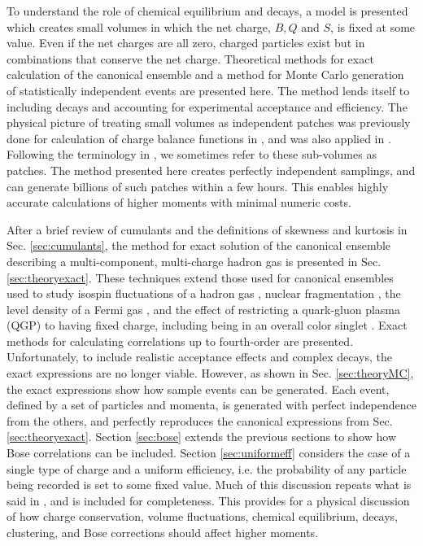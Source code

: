 To understand the role of chemical equilibrium and decays, a model is presented which creates small volumes in which the net charge, $B,Q$ and $S$, is fixed at some value. Even if the net charges are all zero, charged particles exist but in combinations that conserve the net charge. Theoretical methods for exact calculation of the canonical ensemble and a method for Monte Carlo generation of statistically independent events are presented here. The method lends itself to including decays and accounting for experimental acceptance and efficiency. The physical picture of treating small volumes as independent patches was previously done for calculation of charge balance functions in \cite{Schlichting:2010qia,Schlichting:2010na,Pratt:2010zn}, and was also applied in \cite{Oliinychenko:2020cmr}. Following the terminology in \cite{Oliinychenko:2020cmr}, we sometimes refer to these sub-volumes as patches. The method presented here creates perfectly independent samplings, and can generate billions of such patches within a few hours. This enables highly accurate calculations of higher moments with minimal numeric costs.

After a brief review of cumulants and the definitions of skewness and kurtosis in Sec. \ref{sec:cumulants}, the method for exact solution of the canonical ensemble describing a multi-component, multi-charge hadron gas is presented in Sec. \ref{sec:theoryexact}. These techniques extend those used for canonical ensembles used to study isospin fluctuations of a hadron gas \cite{Cheng:2002jb}, nuclear fragmentation \cite{Pratt:1999ht}, the level density of a Fermi gas \cite{Pratt:1999ns}, and the effect of restricting a quark-gluon plasma (QGP) to having fixed charge, including being in an overall color singlet \cite{Pratt:2003jd}. Exact methods for calculating correlations up to fourth-order are presented. Unfortunately, to include realistic acceptance effects and complex decays, the exact expressions are no longer viable. However, as shown in Sec. \ref{sec:theoryMC}, the exact expressions show how sample events can be generated. Each event, defined by a set of particles and momenta, is generated with perfect independence from the others, and perfectly reproduces the canonical expressions from Sec. \ref{sec:theoryexact}. Section \ref{sec:bose} extends the previous sections to show how Bose correlations can be included. Section \ref{sec:uniformeff} considers the case of a single type of charge and a uniform efficiency, i.e. the probability of any particle being recorded is set to some fixed value. Much of this discussion repeats what is said in \cite{Savchuk:2019xfg}, and is included for completeness. This provides for a physical discussion of how charge conservation, volume fluctuations, chemical equilibrium, decays, clustering, and Bose corrections should affect higher moments.

